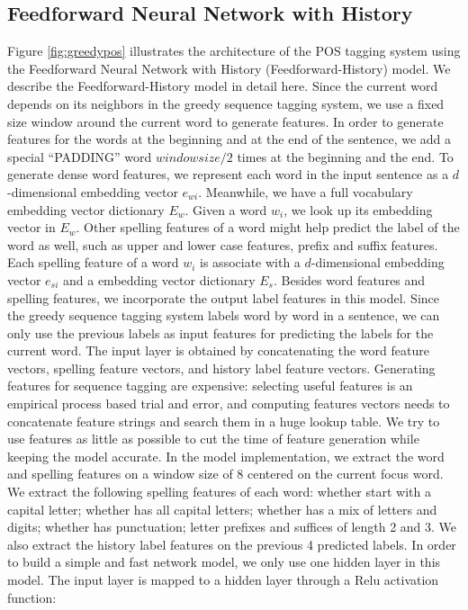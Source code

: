 \documentclass{sfuthesis}
\begin{document}
\subsection{Feedforward Neural Network with History}

Figure \ref{fig:greedypos} illustrates the architecture of the POS tagging system using the Feedforward Neural Network with History (Feedforward-History) model. We describe the Feedforward-History model in detail here. Since the current word depends on its neighbors in the greedy sequence tagging system, we use a fixed size window around the current word to generate features. In order to generate features for the words at the beginning and at the end of the sentence, we add a special “PADDING” word $window size/2$ times at the beginning and the end. To generate dense word features, we represent each word in the input sentence as a $d$-dimensional embedding vector $e_{wi}$. Meanwhile, we have a full vocabulary embedding vector dictionary $E_{w}$. Given a word $w_{i}$, we look up its embedding vector in $E_{w}$. Other spelling features of a word might help predict the label of the word as well, such as upper and lower case features, prefix and suffix features. Each spelling feature of a word $w_{i}$ is associate with a $d$-dimensional embedding vector $e_{si}$ and a embedding vector dictionary $E_{s}$. Besides word features and spelling features, we incorporate the output label features in this model. Since the greedy sequence tagging system labels word by word in a sentence, we can only use the previous labels as input features for predicting the labels for the current word. The input layer is obtained by concatenating the word feature vectors, spelling feature vectors, and history label feature vectors. Generating features for sequence tagging are expensive: selecting useful features is an empirical process based trial and error, and computing features vectors needs to concatenate feature strings and search them in a huge lookup table. We try to use features as little as possible to cut the time of feature generation while keeping the model accurate. In the model implementation, we extract the word and spelling features on a window size of 8 centered on the current focus word. We extract the following spelling features of each word: whether start with a capital letter; whether has all capital letters; whether has a mix of letters and digits; whether has punctuation; letter prefixes and suffices of length 2 and 3. We also extract the history label features on the previous 4 predicted labels. In order to build a simple and fast network model, we only use one hidden layer in this model. The input layer is mapped to a hidden layer through a Relu activation function:
\end{document}
